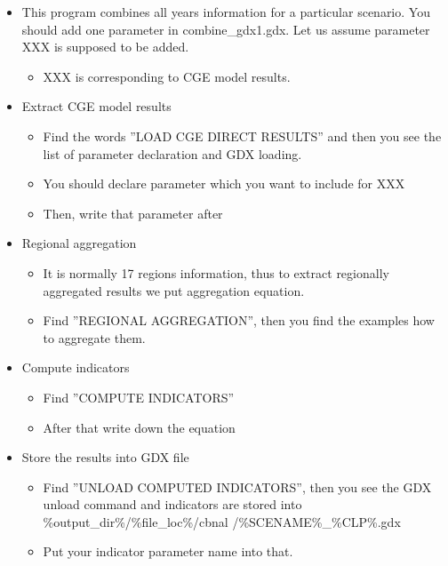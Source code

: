 \documentclass[10pt,a4paper,titlepage,dvipdfmx]{book}
\begin{document}
\begin{itemize}
\item This program combines all years information for a particular scenario. You should add one parameter in combine\_gdx1.gdx. Let us assume parameter XXX is supposed to be added.
\begin{itemize}
\item XXX is corresponding to CGE model results. 
\end{itemize}

\item Extract CGE model results 
\begin{itemize}
\item Find the words ''LOAD CGE DIRECT RESULTS'' and then you see the list of parameter declaration and GDX loading.
\item You should declare parameter which you want to include for XXX
\item Then, write that parameter after 
\end{itemize}

\item Regional aggregation
\begin{itemize}
\item It is normally 17 regions information, thus to extract regionally aggregated results we put aggregation equation.
\item Find ''REGIONAL AGGREGATION'', then you find the examples how to aggregate them.
\end{itemize}

\item Compute indicators
\begin{itemize}
\item Find ''COMPUTE INDICATORS''
\item After that write down the equation
\end{itemize}

\item Store the results into GDX file
\begin{itemize}
\item Find ''UNLOAD COMPUTED INDICATORS'', then you see the GDX unload command and indicators are stored into \%output\_dir\%/\%file\_loc\%/cbnal /\%SCENAME\%\_\%CLP\%.gdx
\item Put your indicator parameter name into that.
\end{itemize}

\end{itemize}
\end{document}
